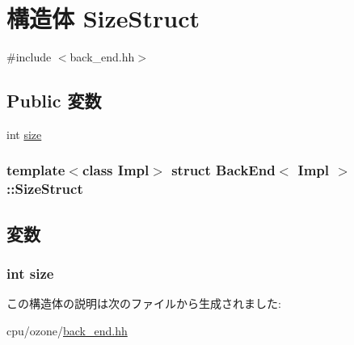 \hypertarget{structBackEnd_1_1SizeStruct}{
\section{構造体 SizeStruct}
\label{structBackEnd_1_1SizeStruct}
}


{\ttfamily \#include $<$back\_\-end.hh$>$}\subsection*{Public 変数}
\begin{DoxyCompactItemize}
\item 
int \hyperlink{structBackEnd_1_1SizeStruct_a439227feff9d7f55384e8780cfc2eb82}{size}
\end{DoxyCompactItemize}
\subsubsection*{template$<$class Impl$>$ struct BackEnd$<$ Impl $>$::SizeStruct}



\subsection{変数}
\hypertarget{structBackEnd_1_1SizeStruct_a439227feff9d7f55384e8780cfc2eb82}{
\subsubsection[{size}]{\setlength{\rightskip}{0pt plus 5cm}int {\bf size}}}
\label{structBackEnd_1_1SizeStruct_a439227feff9d7f55384e8780cfc2eb82}


この構造体の説明は次のファイルから生成されました:\begin{DoxyCompactItemize}
\item 
cpu/ozone/\hyperlink{back__end_8hh}{back\_\-end.hh}\end{DoxyCompactItemize}
